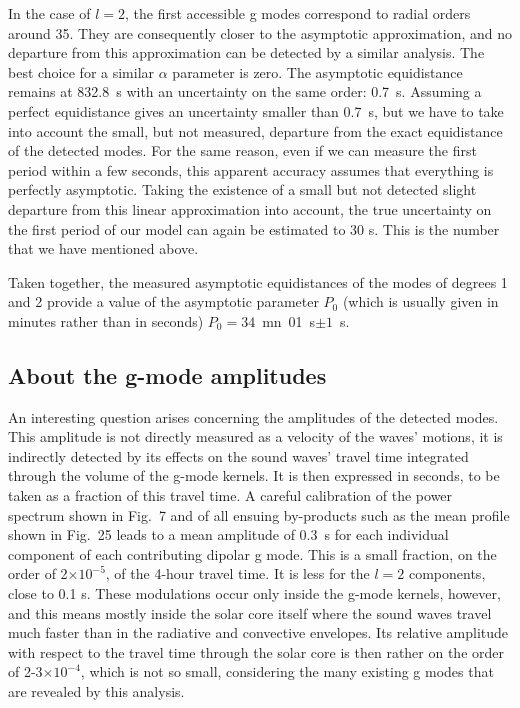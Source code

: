 \documentclass[bibyear]{aa}
\begin{document}
In the case of $l=2$, the first accessible g modes correspond to radial orders  around 35. They are consequently closer to the asymptotic approximation, and no departure from this approximation can be detected by a similar analysis. The best choice for a similar $\alpha$ parameter is zero. The asymptotic equidistance remains  at 832.8~s with an uncertainty on the same order: 0.7~s. Assuming a perfect equidistance gives an uncertainty smaller than 0.7~s, but we have to take into account the small, but not measured, departure from the exact equidistance of the detected modes. For the same reason, even if we can measure the first period within a few seconds, this apparent accuracy assumes that everything is perfectly asymptotic. Taking the existence of a small but not detected slight departure from this linear approximation
into account, the true uncertainty on the first period of our model can again be estimated to 30 s. This is the number that we have mentioned above.

Taken together, the measured asymptotic equidistances of the
modes of degrees 1 and 2 provide a value of the asymptotic parameter $P_{0}$ (which is usually given in minutes rather than in seconds) $P_{0}=34$~mn~01~s$\pm 1$~s.

\subsection{About the g-mode amplitudes}

An interesting question arises concerning the amplitudes of the detected modes. This amplitude is not directly measured as a velocity of the waves' motions, it is indirectly detected by its effects on the sound waves' travel time integrated through the volume of the g-mode kernels. It is then expressed in seconds, to be taken as a fraction of this travel time. A careful calibration of the power spectrum shown in Fig.~7 and of all ensuing by-products such as the mean profile shown in Fig.~25 leads to a mean amplitude of 0.3~s for each individual component of each contributing dipolar g mode. This is a small fraction, on the order of 2$\times10^{-5}$, of the 4-hour travel time. It is less for the $l=2$ components, close to 0.1 s. These modulations occur only inside the g-mode kernels, however, and this means mostly inside the solar core itself where the sound waves travel much faster than in the radiative and convective envelopes. Its relative amplitude with respect to the travel time through the solar core is then rather on the order of 2-3$\times10^{-4}$, which is not so small, considering the many existing g modes that are revealed by this analysis. 
\end{document}
